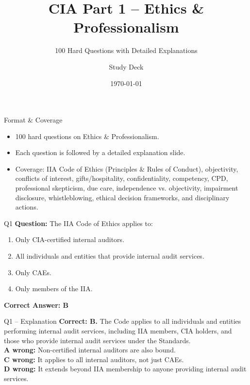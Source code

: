 \documentclass[aspectratio=169,10pt]{beamer}
\title{CIA Part 1 -- Ethics \& Professionalism}
\subtitle{100 Hard Questions with Detailed Explanations}
\author{Study Deck}
\date{\today}
\begin{document}
	
	\begin{frame}
		\titlepage
	\end{frame}
	
	\begin{frame}{Format \& Coverage}
		\small
		\begin{itemize}
			\item 100 hard questions on Ethics \& Professionalism.
			\item Each question is followed by a detailed explanation slide.
			\item Coverage: IIA Code of Ethics (Principles \& Rules of Conduct),
			objectivity, conflicts of interest, gifts/hospitality, confidentiality,
			competency, CPD, professional skepticism, due care, independence vs.
			objectivity, impairment disclosure, whistleblowing, ethical decision
			frameworks, and disciplinary actions.
		\end{itemize}
	\end{frame}
	
	\begin{frame}[t]{Q1}
		\small
		\textbf{Question:} The IIA Code of Ethics applies to:
		\begin{enumerate}[label=\Alph*.,itemsep=1pt,topsep=2pt]
			\item Only CIA-certified internal auditors.
			\item All individuals and entities that provide internal audit services.
			\item Only CAEs.
			\item Only members of the IIA.
		\end{enumerate}
		\vspace{4pt}
		\textbf{Correct Answer: B}
	\end{frame}
	
	\begin{frame}[t]{Q1 -- Explanation}
		\small
		\textbf{Correct: B.} The Code applies to all individuals and entities performing internal audit services, including IIA members, CIA holders, and those who provide internal audit services under the Standards. \\[4pt]
		\textbf{A wrong:} Non-certified internal auditors are also bound. \\[2pt]
		\textbf{C wrong:} It applies to all internal auditors, not just CAEs. \\[2pt]
		\textbf{D wrong:} It extends beyond IIA membership to anyone providing internal audit services.
	\end{frame}
	
\end{document}

